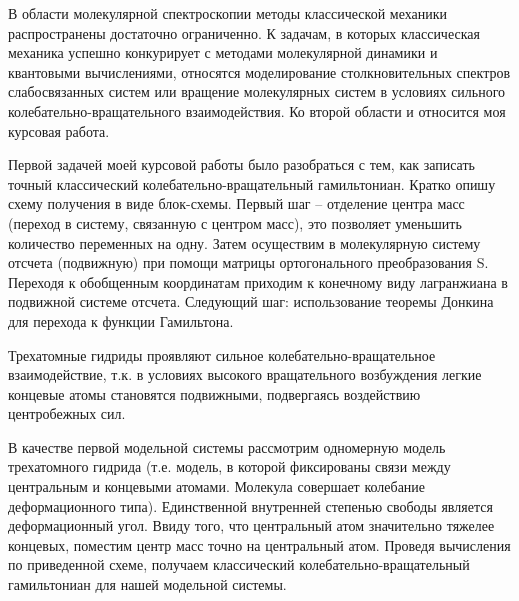 \documentclass[12pt]{article}
\begin{document}
В области молекулярной спектроскопии методы классической механики распространены достаточно ограниченно. К задачам, в которых классическая механика успешно конкурирует с методами молекулярной динамики и квантовыми вычислениями, относятся моделирование столкновительных спектров слабосвязанных систем или вращение молекулярных систем в условиях сильного колебательно-вращательного взаимодействия. Ко второй области и относится моя курсовая работа. \par
Первой задачей моей курсовой работы было разобраться с тем, как записать точный классический колебательно-вращательный гамильтониан. Кратко опишу схему получения в виде блок-схемы. Первый шаг -- отделение центра масс (переход в систему, связанную с центром масс), это позволяет уменьшить количество переменных на одну. Затем осуществим в молекулярную систему отсчета (подвижную) при помощи матрицы ортогонального преобразования S. Переходя к обобщенным координатам приходим к конечному виду лагранжиана в подвижной системе отсчета. Следующий шаг: использование теоремы Донкина для перехода к функции Гамильтона. \par
Трехатомные гидриды проявляют сильное колебательно-вращательное взаимодействие, т.к. в условиях высокого вращательного возбуждения легкие концевые атомы становятся подвижными, подвергаясь воздействию центробежных сил. \par
В качестве первой модельной системы рассмотрим одномерную модель трехатомного гидрида (т.е. модель, в которой фиксированы связи между центральным и концевыми атомами. Молекула совершает колебание деформационного типа). Единственной внутренней степенью свободы является деформационный угол. Ввиду того, что центральный атом значительно тяжелее концевых, поместим центр масс точно на центральный атом. Проведя вычисления по приведенной схеме, получаем классический колебательно-вращательный гамильтониан для нашей модельной системы. \par
\end{document}
